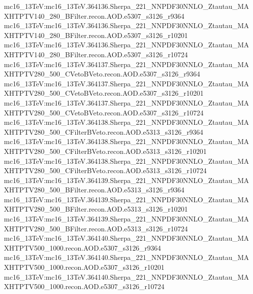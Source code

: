 { mc16\_13TeV:mc16\_13TeV.364136.Sherpa\_221\_NNPDF30NNLO\_Ztautau\_MAXHTPTV140\_280\_BFilter.recon.AOD.e5307\_s3126\_r9364 \newline  
 mc16\_13TeV:mc16\_13TeV.364136.Sherpa\_221\_NNPDF30NNLO\_Ztautau\_MAXHTPTV140\_280\_BFilter.recon.AOD.e5307\_s3126\_r10201 \newline  
 mc16\_13TeV:mc16\_13TeV.364136.Sherpa\_221\_NNPDF30NNLO\_Ztautau\_MAXHTPTV140\_280\_BFilter.recon.AOD.e5307\_s3126\_r10724 \newline  
 mc16\_13TeV:mc16\_13TeV.364137.Sherpa\_221\_NNPDF30NNLO\_Ztautau\_MAXHTPTV280\_500\_CVetoBVeto.recon.AOD.e5307\_s3126\_r9364   \newline
 mc16\_13TeV:mc16\_13TeV.364137.Sherpa\_221\_NNPDF30NNLO\_Ztautau\_MAXHTPTV280\_500\_CVetoBVeto.recon.AOD.e5307\_s3126\_r10201 \newline  
 mc16\_13TeV:mc16\_13TeV.364137.Sherpa\_221\_NNPDF30NNLO\_Ztautau\_MAXHTPTV280\_500\_CVetoBVeto.recon.AOD.e5307\_s3126\_r10724 \newline  
 mc16\_13TeV:mc16\_13TeV.364138.Sherpa\_221\_NNPDF30NNLO\_Ztautau\_MAXHTPTV280\_500\_CFilterBVeto.recon.AOD.e5313\_s3126\_r9364 \newline  
 mc16\_13TeV:mc16\_13TeV.364138.Sherpa\_221\_NNPDF30NNLO\_Ztautau\_MAXHTPTV280\_500\_CFilterBVeto.recon.AOD.e5313\_s3126\_r10201 \newline  
 mc16\_13TeV:mc16\_13TeV.364138.Sherpa\_221\_NNPDF30NNLO\_Ztautau\_MAXHTPTV280\_500\_CFilterBVeto.recon.AOD.e5313\_s3126\_r10724  \newline 
 mc16\_13TeV:mc16\_13TeV.364139.Sherpa\_221\_NNPDF30NNLO\_Ztautau\_MAXHTPTV280\_500\_BFilter.recon.AOD.e5313\_s3126\_r9364\newline   
 mc16\_13TeV:mc16\_13TeV.364139.Sherpa\_221\_NNPDF30NNLO\_Ztautau\_MAXHTPTV280\_500\_BFilter.recon.AOD.e5313\_s3126\_r10201\newline   
 mc16\_13TeV:mc16\_13TeV.364139.Sherpa\_221\_NNPDF30NNLO\_Ztautau\_MAXHTPTV280\_500\_BFilter.recon.AOD.e5313\_s3126\_r10724 \newline  
 mc16\_13TeV:mc16\_13TeV.364140.Sherpa\_221\_NNPDF30NNLO\_Ztautau\_MAXHTPTV500\_1000.recon.AOD.e5307\_s3126\_r9364 \newline  
 mc16\_13TeV:mc16\_13TeV.364140.Sherpa\_221\_NNPDF30NNLO\_Ztautau\_MAXHTPTV500\_1000.recon.AOD.e5307\_s3126\_r10201 \newline  
 mc16\_13TeV:mc16\_13TeV.364140.Sherpa\_221\_NNPDF30NNLO\_Ztautau\_MAXHTPTV500\_1000.recon.AOD.e5307\_s3126\_r10724  \newline 
}
